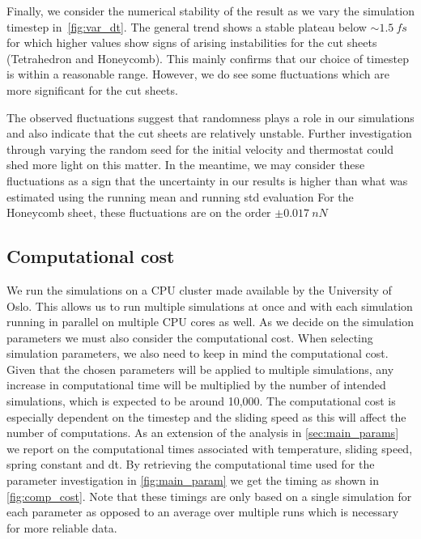 Finally, we consider the numerical stability of the result as we vary the
simulation timestep in~\cref{fig:var_dt}. The general trend shows a stable
plateau below $\sim \SI{1.5}{fs}$ for which higher values show signs of arising
instabilities for the cut sheets (Tetrahedron and Honeycomb). This mainly
confirms that our choice of timestep is within a reasonable range. However, we
do see some fluctuations which are more significant for the cut sheets.

The observed fluctuations suggest that randomness plays a role in our simulations and also indicate that the cut sheets are relatively unstable. Further investigation through varying the random seed for the initial velocity and thermostat could shed more light on this matter. In the meantime, we may consider these fluctuations as a sign that the uncertainty in our results is higher than what was estimated using the running mean and running \acrshort{std} evaluation For the Honeycomb sheet, these fluctuations are on the order $\pm \SI{0.017}{nN}$ 



\subsection{Computational cost}
We run the simulations on a CPU cluster made available by the University of Oslo. This allows us to run multiple simulations at once and with each simulation running in parallel on multiple CPU cores as well. As we decide on the simulation parameters we must also consider the computational cost. When selecting simulation parameters, we also need to keep in mind the computational cost. Given that the chosen parameters will be applied to multiple simulations, any increase in computational time will be multiplied by the number of intended simulations, which is expected to be around 10,000. The computational cost is especially dependent on the timestep and the sliding speed as this will affect the number of computations. As an extension of the analysis in \cref{sec:main_params} we
report on the computational times associated with temperature, sliding speed,
spring constant and dt. By retrieving the computational time used for the
parameter investigation in \cref{fig:main_param} we get the timing as shown in
\cref{fig:comp_cost}. Note that these timings are only based on a single simulation for each parameter as opposed to an average over multiple runs which is
necessary for more reliable data. 


